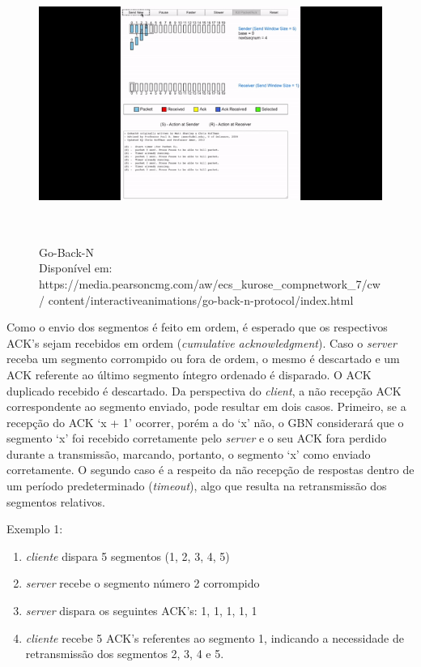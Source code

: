 \begin{figure}[h!]
\centering
\includegraphics[keepaspectratio, width=12cm, height=9cm]{imagens/12/12 - GBN.png}
\caption{Go-Back-N \\
Disponível em:
https://media.pearsoncmg.com/aw/ecs\_kurose\_compnetwork\_7/cw/
content/interactiveanimations/go-back-n-protocol/index.html \\}
\label{Go-Back-N}
\end{figure}



Como o envio dos segmentos é feito em ordem, é esperado que os
respectivos ACK's sejam recebidos em ordem (\emph{cumulative
acknowledgment}). Caso o \emph{server} receba um segmento corrompido ou
fora de ordem, o mesmo é descartado e um ACK referente ao último
segmento íntegro ordenado é disparado. O ACK duplicado recebido é
descartado. Da perspectiva do \emph{client}, a não recepção ACK
correspondente ao segmento enviado, pode resultar em dois casos.
Primeiro, se a recepção do ACK `x + 1' ocorrer, porém a do `x' não, o
GBN considerará que o segmento `x' foi recebido corretamente pelo
\emph{server} e o seu ACK fora perdido durante a transmissão, marcando,
portanto, o segmento `x' como enviado corretamente. O segundo caso é a
respeito da não recepção de respostas dentro de um período
predeterminado (\emph{timeout}), algo que resulta na retransmissão dos
segmentos relativos.

Exemplo 1:

\begin{enumerate}
\def\labelenumi{\arabic{enumi}.}
\tightlist
\item
  \emph{cliente} dispara 5 segmentos (1, 2, 3, 4, 5)
\item
  \emph{server} recebe o segmento número 2 corrompido
\item
  \emph{server} dispara os seguintes ACK's: 1, 1, 1, 1, 1
\item
  \emph{cliente} recebe 5 ACK's referentes ao segmento 1, indicando a
  necessidade de retransmissão dos segmentos 2, 3, 4 e 5.
\end{enumerate}

